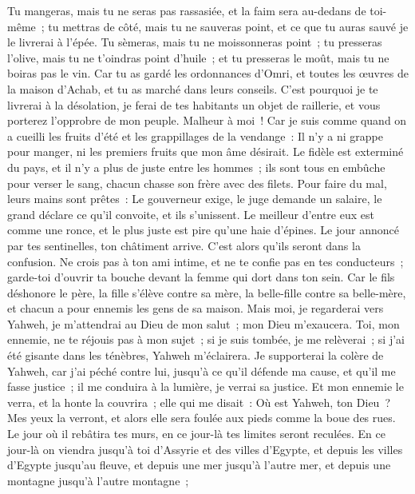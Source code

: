 \begin{multicols}{2}
Tu mangeras, mais tu ne seras pas rassasiée, et la faim sera au-dedans de toi-même~; tu mettras de côté, mais tu ne sauveras point, et ce que tu auras sauvé je le livrerai à l'épée.
Tu sèmeras, mais tu ne moissonneras point~; tu presseras l'olive, mais tu ne t'oindras point d'huile~; et tu presseras le moût, mais tu ne boiras pas le vin.
Car tu as gardé les ordonnances d'Omri, et toutes les œuvres de la maison d'Achab, et tu as marché dans leurs conseils. C'est pourquoi je te livrerai à la désolation, je ferai de tes habitants un objet de raillerie, et vous porterez l'opprobre de mon peuple.
\VerseOne{}Malheur à moi~! Car je suis comme quand on a cueilli les fruits d'été et les grappillages de la vendange~: Il n'y a ni grappe pour manger, ni les premiers fruits que mon âme désirait.
Le fidèle est exterminé du pays, et il n'y a plus de juste entre les hommes~; ils sont tous en embûche pour verser le sang, chacun chasse son frère avec des filets.
Pour faire du mal, leurs mains sont prêtes~: Le gouverneur exige, le juge demande un salaire, le grand déclare ce qu'il convoite, et ils s'unissent.
Le meilleur d'entre eux est comme une ronce, et le plus juste est pire qu'une haie d'épines. Le jour annoncé par tes sentinelles, ton châtiment arrive. C'est alors qu'ils seront dans la confusion.
Ne crois pas à ton ami intime, et ne te confie pas en tes conducteurs~; garde-toi d'ouvrir ta bouche devant la femme qui dort dans ton sein.
Car le fils déshonore le père, la fille s'élève contre sa mère, la belle-fille contre sa belle-mère, et chacun a pour ennemis les gens de sa maison.
Mais moi, je regarderai vers Yahweh, je m'attendrai au Dieu de mon salut~; mon Dieu m'exaucera.
Toi, mon ennemie, ne te réjouis pas à mon sujet~; si je suis tombée, je me relèverai~; si j'ai été gisante dans les ténèbres, Yahweh m'éclairera.
Je supporterai la colère de Yahweh, car j'ai péché contre lui, jusqu'à ce qu'il défende ma cause, et qu'il me fasse justice~; il me conduira à la lumière, je verrai sa justice.
Et mon ennemie le verra, et la honte la couvrira~; elle qui me disait~: Où est Yahweh, ton Dieu~? Mes yeux la verront, et alors elle sera foulée aux pieds comme la boue des rues.
Le jour où il rebâtira tes murs, en ce jour-là tes limites seront reculées.
En ce jour-là on viendra jusqu'à toi d'Assyrie et des villes d'Egypte, et depuis les villes d'Egypte jusqu'au fleuve, et depuis une mer jusqu'à l'autre mer, et depuis une montagne jusqu'à l'autre montagne~;

\end{multicols}
